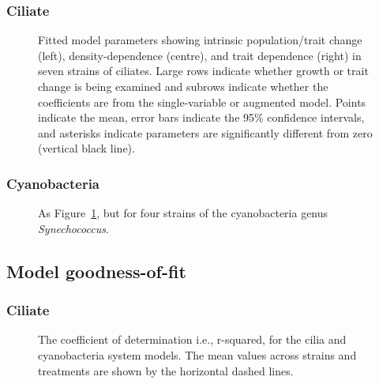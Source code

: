 \documentclass[
  letterpaper,
  DIV=11,
  numbers=noendperiod]{scrartcl}
\begin{document}
\subsubsection{Ciliate}\label{ciliate-3}

\begin{figure}


\caption{\label{fig-cilia-td-general}Fitted model parameters showing
intrinsic population/trait change (left), density-dependence (centre),
and trait dependence (right) in seven strains of ciliates. Large rows
indicate whether growth or trait change is being examined and subrows
indicate whether the coefficients are from the single-variable or
augmented model. Points indicate the mean, error bars indicate the 95\%
confidence intervals, and asterisks indicate parameters are
significantly different from zero (vertical black line).}

\end{figure}%

\subsubsection{Cyanobacteria}\label{cyanobacteria-3}

\begin{figure}


\caption{\label{fig-cyano-td-general}As
Figure~\ref{fig-cilia-td-general}, but for four strains of the
cyanobacteria genus \emph{Synechococcus}.}

\end{figure}%

\subsection{Model goodness-of-fit}\label{model-goodness-of-fit}

\subsubsection{Ciliate}\label{ciliate-4}

\begin{figure}


\caption{\label{fig-R2}The coefficient of determination i.e., r-squared,
for the cilia and cyanobacteria system models. The mean values across
strains and treatments are shown by the horizontal dashed lines.}

\end{figure}%
\end{document}

